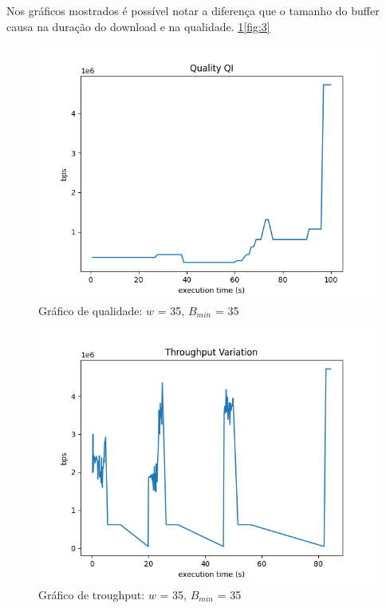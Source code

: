 \documentclass[10pt,twocolumn,letterpaper]{article}
\begin{document}
Nos gráficos mostrados é possível notar a diferença que o tamanho do buffer causa na duração do download e na qualidade. \ref{fig:1}\ref{fig:3}
\begin{figure}
	\centering
	\includegraphics[width=\linewidth]{0.35 - 35 - qual.png}
	\caption{Gráfico de qualidade: $w$ = 35, $B_{min}$ = 35}
	\label{fig:1}
\end{figure}
\begin{figure}
	\centering
	\includegraphics[width=\linewidth]{0.358 -35 -throughput.png}
	\caption{Gráfico de troughput: $w$ = 35, $B_{min}$ = 35}
	\label{fig:2}
\end{figure}
\end{document}
